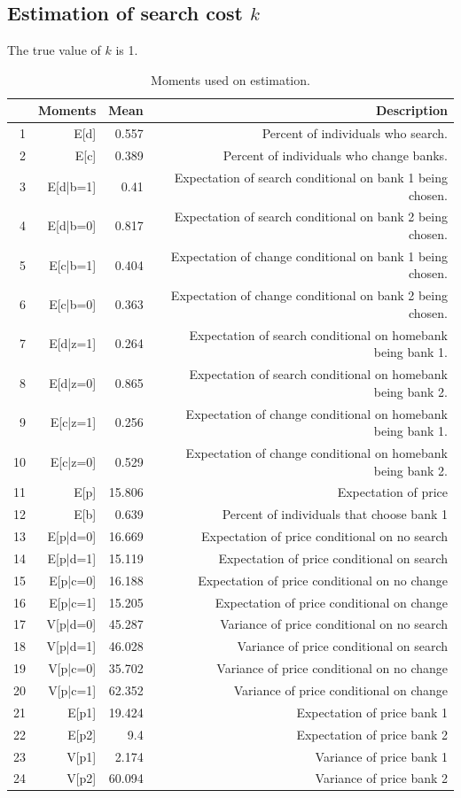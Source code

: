 \documentclass[12pt]{article}
\theoremstyle{definition}
\begin{document}
\subsection{Estimation of search cost $k$}

The true value of $k$ is 1. 
\begin{table}
\centering
\begin{tabular}{rrrr}
\toprule
 & Moments & Mean & Description\\
\midrule
1 & E[d] & 0.557 & Percent of individuals who search.\\
2 & E[c] & 0.389 & Percent of individuals who change banks.\\
3 & E[d|b=1] & 0.41 & Expectation of search conditional on bank 1 being chosen.\\
4 & E[d|b=0] & 0.817 & Expectation of search conditional on bank 2 being chosen.\\
5 & E[c|b=1] & 0.404 & Expectation of change conditional on bank 1 being chosen.\\
6 & E[c|b=0] & 0.363 & Expectation of change conditional on bank 2 being chosen.\\
7 & E[d|z=1] & 0.264 & Expectation of search conditional on homebank being bank 1.\\
8 & E[d|z=0] & 0.865 & Expectation of search conditional on homebank being bank 2.\\
9 & E[c|z=1] & 0.256 & Expectation of change conditional on homebank being bank 1.\\
10 & E[c|z=0] & 0.529 & Expectation of change conditional on homebank being bank 2.\\
11 & E[p] & 15.806 & Expectation of price\\
12 & E[b] & 0.639 & Percent of individuals that choose bank 1\\
13 & E[p|d=0] & 16.669 & Expectation of price conditional on no search\\
14 & E[p|d=1] & 15.119 & Expectation of price conditional on search\\
15 & E[p|c=0] & 16.188 & Expectation of price conditional on no change\\
16 & E[p|c=1] & 15.205 & Expectation of price conditional on change\\
17 & V[p|d=0] & 45.287 & Variance of price conditional on no search\\
18 & V[p|d=1] & 46.028 & Variance of price conditional on search\\
19 & V[p|c=0] & 35.702 & Variance of price conditional on no change\\
20 & V[p|c=1] & 62.352 & Variance of price conditional on change\\
21 & E[p1] & 19.424 & Expectation of price bank 1\\
22 & E[p2] & 9.4 & Expectation of price bank 2\\
23 & V[p1] & 2.174 & Variance of price bank 1\\
24 & V[p2] & 60.094 & Variance of price bank 2\\
\bottomrule
\end{tabular}
\caption{Moments used on estimation.}
\end{table}
\end{document}
